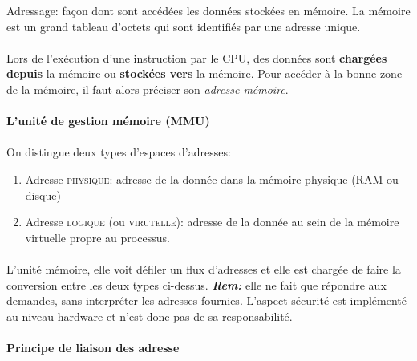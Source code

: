 \item{}
{
Adressage: façon dont sont accédées les données stockées en mémoire. La mémoire est un grand tableau d'octets qui sont identifiés par une adresse unique. 

\paragraph{}
Lors de l'exécution d'une instruction par le CPU, des données sont \textbf{chargées depuis} la mémoire ou \textbf{stockées vers} la mémoire. Pour accéder à la bonne zone de la mémoire, il faut alors préciser son \textit{adresse mémoire}.

\paragraph{L'unité de gestion mémoire (MMU)}
\paragraph{}
On distingue deux types d'espaces d'adresses:
\begin{enumerate}
\item Adresse \textsc{physique}: adresse de la donnée dans la mémoire physique (RAM ou disque)
\item Adresse \textsc{logique} (ou \textsc{virutelle)}: adresse de la donnée au sein de la mémoire virtuelle propre au processus.
\end{enumerate}
\paragraph{}
L'unité mémoire, elle voit défiler un flux d'adresses et elle est chargée de faire la conversion entre les deux types ci-dessus. \textbf{\textit{Rem:}} elle ne fait que répondre aux demandes, sans interpréter les adresses fournies. L'aspect sécurité est implémenté au niveau hardware et n'est donc pas de sa responsabilité.


\paragraph{Principe de liaison des adresse}
}


